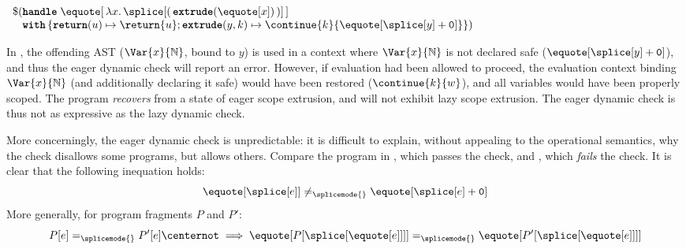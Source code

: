 \begin{code} 
 \begin{source}
  $\begin{array}{l}
      \$ (\textbf{\texttt{handle}} \; \equote[\, {\lambda x. \, {\splice[(\, {{\textbf{\texttt{extrude}}(\equote[x])}} \, )]}}\,] \\
      \;\;\,\,\textbf{\texttt{with}} \, \{ \textbf{\texttt{return}}(u) \mapsto {\return{u}}; \textbf{\texttt{extrude}}(y, k) \mapsto {{\continue{k}{\equote[{\splice[y]} + \texttt{0}]}}}\})
    \end{array}$
 \end{source}
 \label{listing:eager-scope-extrusion-looks-unsafe}
\end{code}

In , the offending AST ($\Var{x}{\mathbb{N}}$, bound to $y$) is used in a context where $\Var{x}{\mathbb{N}}$ is not declared safe ($\equote[{\splice[y]} + \texttt{0}]$), and thus the eager dynamic check will report an error. However, if evaluation had been allowed to proceed, the evaluation context binding $\Var{x}{\mathbb{N}}$ (and additionally declaring it safe) would have been restored ($\continue{k}{w}$), and all variables would have been properly scoped. The program \textit{recovers} from a state of eager scope extrusion, and will not exhibit lazy scope extrusion. The eager dynamic check is thus not as expressive as the lazy dynamic check.

More concerningly, the eager dynamic check is unpredictable: it is difficult to explain, without appealing to the operational semantics, why the check disallows some programs, but allows others. Compare the program in , which passes the check, and , which \textit{fails} the check. It is clear that the following inequation holds:
\[\equote[\splice[e]] \neq_{\splicemode{}} \equote[{\splice[e] + \texttt{0}}]\]
More generally, for program fragments $P$ and $P'$:
\[P[e] =_{\splicemode{}} P'[e] \centernot\implies \equote[{P[\splice[{\equote[e]}]]}] =_{\splicemode{}} \equote[{P'[\splice[{\equote[e]}]]}]\]

